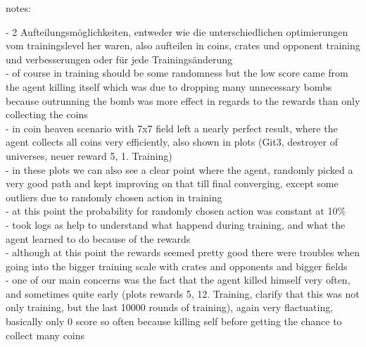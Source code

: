 notes:

- 2 Aufteilungsmöglichkeiten, entweder wie die unterschiedlichen optimierungen vom trainingslevel her waren, also aufteilen in coins, crates und opponent training und verbesserungen oder für jede Trainingsänderung\\
- of course in training should be some randomness but the low score came from the agent killing itself which was due to dropping many unnecessary bombs because outrunning the bomb was more effect in regards to the rewards than only collecting the coins\\
- in coin heaven scenario with 7x7 field left a nearly perfect result, where the agent collects all coins very efficiently, also shown in plots (Git3, destroyer of universes, neuer reward 5, 1. Training)\\
- in these plots we can also see a clear point where the agent, randomly picked a very good path and kept improving on that till final converging, except some outliers due to randomly chosen action in training\\
- at this point the probability for randomly chosen action was constant at 10\%\\
- took logs as help to understand what happend during training, and what the agent learned to do because of the rewards\\
- although at this point the rewards seemed pretty good there were troubles when going into the bigger training scale with crates and opponents and bigger fields\\
- one of our main concerns was the fact that the agent killed himself very often, and sometimes quite early (plots rewards 5, 12. Training, clarify that this was not only training, but the last 10000 rounds of training), again very flactuating, basically only 0 score so often because killing self before getting the chance to collect many coins\\
